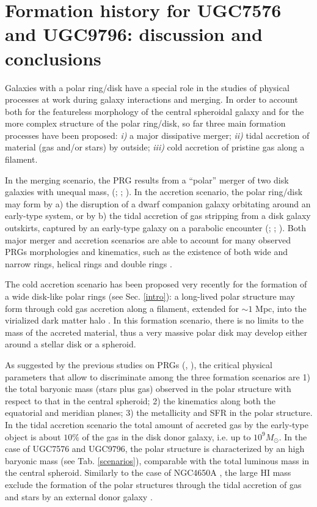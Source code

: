 \documentclass{aa}
\begin{document}
\section{Formation history for UGC7576 and UGC9796: discussion and conclusions}\label{conc}
Galaxies with a polar ring/disk have a special role in the studies of
physical processes at work during galaxy interactions and merging. In
order to account both for the featureless morphology of the central
spheroidal galaxy and for the more complex structure of the polar
ring/disk, so far three main formation processes have been
proposed: {\it i)} a major dissipative merger; {\it ii)} tidal
accretion of material (gas and/or stars) by outside; {\it iii)} cold
accretion of pristine gas along a filament.

In the merging scenario, the PRG results from a ``polar'' merger of
two disk galaxies with unequal mass, (\citealt{Bek97};
\citealt{Bek98}; \citealt{Bou05}). In the accretion scenario, the
polar ring/disk may form by a) the disruption of a dwarf companion
galaxy orbitating around an early-type system, or by b) the tidal
accretion of gas stripping from a disk galaxy outskirts, captured by
an early-type galaxy on a parabolic encounter (\citealt{Res97};
\citealt{Bou03}; \citealt{Han09}). Both major merger and accretion
scenarios are able to account for many observed PRGs morphologies and
kinematics, such as the existence of both wide and narrow rings,
helical rings and double rings \citep{Whi90}.

The cold accretion scenario has been proposed very recently for the
formation of a wide disk-like polar rings (see Sec. \ref{intro}): a
long-lived polar structure may form through cold gas accretion along a
filament, extended for $\sim 1$ Mpc, into the virialized dark matter
halo \citep{Mac06}. In this formation scenario, there is no limits to
the mass of the accreted material, thus a very massive polar disk may
develop either around a stellar disk or a spheroid.

As suggested by the previous studies on PRGs (\citealt{Spav10},
\citealt{Iod06}), the critical physical parameters that allow to
discriminate among the three formation scenarios are 1) the total
baryonic mass (stars plus gas) observed in the polar structure with
respect to that in the central spheroid; 2) the kinematics along both
the equatorial and meridian planes; 3) the metallicity and SFR in the
polar structure.\\ In the tidal accretion scenario the total amount of
accreted gas by the early-type object is about $10\%$ of the gas in
the disk donor galaxy, i.e. up to $10^{9}M_{\odot}$. In the case of
UGC7576 and UGC9796, the polar structure is characterized by an high
baryonic mass (see Tab. \ref{scenarios}), comparable with the total
luminous mass in the central spheroid. Similarly to the case of
NGC4650A \citep{Spav10}, the large HI mass exclude the formation of
the polar structures through the tidal accretion of gas and stars by
an external donor galaxy \citep{Bou03}.
\end{document}
